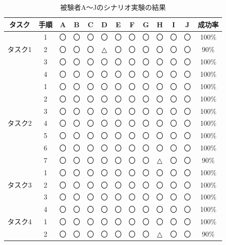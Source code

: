 \documentclass[11pt,a4j, titlepage]{jarticle} %
\begin{document}
\begin{table}[H]
  \caption{被験者A～Jのシナリオ実験の結果}
  \label{table:jikken_kekka}
  \begin{center}
  \begin{tabular}{|c||c|c|c|c|c|c|c|c|c|c|c||c|} \hline
    タスク & 手順 & A & B & C & D & E & F & G & H & I & J & 成功率 \\ \hline \hline
             & 1 & 〇 & 〇 & 〇 & 〇 & 〇 & 〇 & 〇 & 〇 & 〇 & 〇 & 100\% \\ \cline{2-13}
    タスク1 & 2 & 〇 & 〇 & 〇 & △ & 〇 & 〇 & 〇 & 〇 & 〇 & 〇 &  90\% \\ \cline{2-13}
             & 3 & 〇 & 〇 & 〇 & 〇 & 〇 & 〇 & 〇 & 〇 & 〇 & 〇 & 100\% \\ \cline{2-13}
             & 4 & 〇 & 〇 & 〇 & 〇 & 〇 & 〇 & 〇 & 〇 & 〇 & 〇 & 100\% \\ \cline{2-13} \hline \hline
             & 1 & 〇 & 〇 & 〇 & 〇 & 〇 & 〇 & 〇 & 〇 & 〇 & 〇 & 100\% \\ \cline{2-13}
             & 2 & 〇 & 〇 & 〇 & 〇 & 〇 & 〇 & 〇 & 〇 & 〇 & 〇 & 100\% \\ \cline{2-13}
             & 3 & 〇 & 〇 & 〇 & 〇 & 〇 & 〇 & 〇 & 〇 & 〇 & 〇 & 100\% \\ \cline{2-13}
    タスク2 & 4 & 〇 & 〇 & 〇 & 〇 & 〇 & 〇 & 〇 & 〇 & 〇 & 〇 & 100\% \\ \cline{2-13}
             & 5 & 〇 & 〇 & 〇 & 〇 & 〇 & 〇 & 〇 & 〇 & 〇 & 〇 & 100\% \\ \cline{2-13}
             & 6 & 〇 & 〇 & 〇 & 〇 & 〇 & 〇 & 〇 & 〇 & 〇 & 〇 & 100\% \\ \cline{2-13}
             & 7 & 〇 & 〇 & 〇 & 〇 & 〇 & 〇 & 〇 & △ & 〇 & 〇 & 90\% \\ \cline{2-13} \hline \hline
             & 1 & 〇 & 〇 & 〇 & 〇 & 〇 & 〇 & 〇 & 〇 & 〇 & 〇 & 100\% \\ \cline{2-13}
    タスク3 & 2 & 〇 & 〇 & 〇 & 〇 & 〇 & 〇 & 〇 & 〇 & 〇 & 〇 & 100\% \\ \cline{2-13}
             & 3 & 〇 & 〇 & 〇 & 〇 & 〇 & 〇 & 〇 & 〇 & 〇 & 〇 & 100\% \\ \cline{2-13}
             & 4 & 〇 & 〇 & 〇 & 〇 & 〇 & 〇 & 〇 & 〇 & 〇 & 〇 & 100\% \\ \cline{2-13} \hline \hline
    タスク4 & 1 & 〇 & 〇 & 〇 & 〇 & 〇 & 〇 & 〇 & 〇 & 〇 & 〇 & 100\% \\ \cline{2-13}
             & 2 & 〇 & 〇 & 〇 & 〇 & 〇 & 〇 & 〇 & △ & 〇 & 〇 & 90\% \\ \cline{2-13} \hline
  \end{tabular}
  \end{center}
\end{table}
\end{document}
